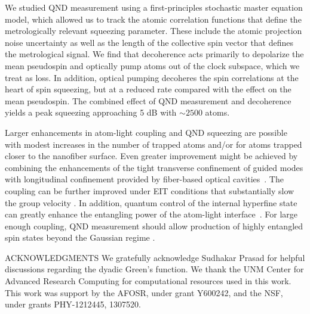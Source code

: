 \documentclass[preprint, aps,pra,onecolumn]{revtex4-1} %
\begin{document}
We studied QND measurement using a first-principles stochastic master equation model, which allowed us to track the atomic correlation functions that define the metrologically relevant squeezing parameter.  
These include the atomic projection noise uncertainty as well as the length of the collective spin vector that defines the metrological signal.  We find that decoherence acts primarily to depolarize the mean pseudospin and optically pump atoms out of the clock subspace, which we treat as loss.  In addition, optical pumping decoheres the spin correlations at the heart of spin squeezing, but at a reduced rate compared with the effect on the mean pseudospin.  
The combined effect of QND measurement and decoherence yields a peak squeezing approaching 5 dB with $\sim 2500$ atoms. 

Larger enhancements in atom-light coupling and QND squeezing are possible with modest increases in the number of trapped atoms and/or for atoms trapped closer to the nanofiber surface.  
Even greater improvement might be achieved by combining the enhancements of the tight transverse confinement of guided modes with longitudinal confinement provided by fiber-based optical cavities~\cite{le_kien_intracavity_2009, wuttke_nanofiber_2012, yalla_cavity_2014, bohnet_reduced_2014,nayak_optical_2014}.  
The coupling can be further improved under EIT conditions that substantially slow the group velocity \cite{gouraud_demonstration_2015, sayrin_storage_2015, kumar_autler-townes_2015, le_kien_electromagnetically_2015}. 
In addition, quantum control of the internal hyperfine state \cite{smith_quantum_2013-1} can greatly enhance the entangling power of the atom-light interface~\cite{trail_strongly_2010, norris_enhanced_2012}. 
For large enough coupling, QND measurement should allow production of highly entangled spin states beyond the Gaussian regime \cite{stockton_deterministic_2004, mcconnell_entanglement_2015}.

ACKNOWLEDGMENTS 
We gratefully acknowledge Sudhakar Prasad for helpful discussions regarding the dyadic Green's function. 
We thank the UNM Center for Advanced Research Computing for computational resources used in this work. 
This work was support by the AFOSR, under grant Y600242, and the NSF, under grants PHY-1212445, 1307520. 
%
%


\end{document}
